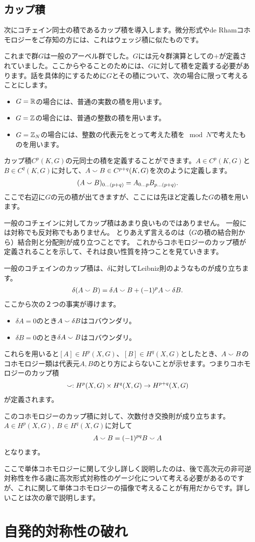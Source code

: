 \documentclass[generalized_symmetry.tex]{subfiles}
\begin{document}
\subsection{カップ積}

次にコチェイン同士の積であるカップ積を導入します。微分形式やde Rhamコホモロジーをご存知の方には、これはウェッジ積に似たものです。

これまで群$G$は一般のアーベル群でした。$G$には元々群演算としての$+$が定義されていました。ここからやることのためには、$G$に対して積を定義する必要があります。話を具体的にするために$G$とその積について、次の場合に限って考えることにします。
\begin{itemize}
    \item $G=\mathbb{R}$の場合には、普通の実数の積を用います。
    \item $G=\mathbb{Z}$の場合には、普通の整数の積を用います。
    \item $G=\mathbb{Z}_N$の場合には、整数の代表元をとって考えた積を$\mod N$で考えたものを用います。
\end{itemize}

カップ積$C^p(K,G)$の元同士の積を定義することができます。$A \in C^p(K,G)$と$B \in C^q(K,G)$に対して、$A \smallsmile B \in C^{p+q}(K,G)$を次のように定義します。
\begin{align}
    (A \smallsmile B)_{0\dots (p+q)} = A_{0\dots p} B_{p \dots (p+q)}.
\end{align}
ここで右辺に$G$の元の積が出てきますが、ここには先ほど定義した$G$の積を用います。

一般のコチェインに対してカップ積はあまり良いものではありません。
一般には対称でも反対称でもありません。
とりあえず言えるのは（$G$の積の結合則から）結合則と分配則が成り立つことです。
これからコホモロジーのカップ積が定義されることを示して、それは良い性質を持つことを見ていきます。

一般のコチェインのカップ積は、$\delta$に対してLeibniz則のようなものが成り立ちます。
\begin{align}
    \delta (A \smallsmile B) = \delta A \smallsmile B + (-1)^{p} A \smallsmile \delta B.
    \label{coboundarycup}
\end{align}
ここから次の２つの事実が導けます。
\begin{itemize}
    \item $\delta A=0$のとき$A\smallsmile \delta B$はコバウンダリ。
    \item $\delta B=0$のとき$\delta A \smallsmile B$はコバウンダリ。
\end{itemize}
これらを用いると$[A] \in H^p(X,G)$、$[B] \in H^{q}(X,G)$としたとき、$A \smallsmile B$のコホモロジー類は代表元$A,B$のとり方によらないことが示せます。つまりコホモロジーのカップ積
\begin{align}
    \smallsmile : H^{p}(X,G)\times H^{q}(X,G) \to H^{p+q}(X,G)
\end{align}
が定義されます。

このコホモロジーのカップ積に対して、次数付き交換則が成り立ちます。$A\in H^{p}(X,G),\ B \in H^{q}(X,G)$に対して
\begin{align}
    A\smallsmile B = (-1)^{pq}B\smallsmile A
\end{align}
となります。

ここで単体コホモロジーに関して少し詳しく説明したのは、後で高次元の非可逆対称性を作る歳に高次形式対称性のゲージ化について考える必要があるのですが、これに関して単体コホモロジーの描像で考えることが有用だからです。詳しいことは次の章で説明します。

\section{自発的対称性の破れ}
\end{document}
